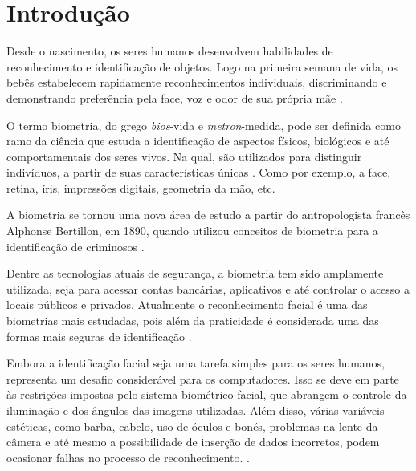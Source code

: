 
\chapter{Introdução}\label{cap:introducao}

Desde o nascimento, os seres humanos desenvolvem habilidades de reconhecimento 
e identificação de objetos. Logo na primeira semana de vida, os bebês estabelecem 
rapidamente reconhecimentos individuais, discriminando e demonstrando preferência 
pela face, voz e odor de sua própria mãe \cite{vieira2017}.

O termo biometria, do grego \textit{bios}-vida e \textit{metron}-medida, pode ser 
definida como ramo da ciência que estuda a identificação de aspectos físicos, biológicos e até 
comportamentais dos seres vivos. Na qual, são utilizados para distinguir indivíduos, 
a partir de suas características únicas \cite{ferreira2009}. Como por exemplo, a face, retina, 
íris, impressões digitais, geometria da mão, etc.

A biometria se tornou uma nova área de estudo a partir do antropologista francês
Alphonse Bertillon, em 1890, quando utilizou conceitos de biometria para a 
identificação de criminosos \cite{moraes2006}. 

Dentre as tecnologias atuais de segurança, a biometria tem sido amplamente 
utilizada, seja para acessar contas bancárias, aplicativos e até controlar 
o acesso a locais públicos e privados. Atualmente o reconhecimento facial 
é uma das biometrias mais estudadas, pois além da praticidade é considerada uma 
das formas mais seguras de identificação \cite{zhao2003}. 

Embora a identificação facial seja uma tarefa simples para os seres humanos, 
representa um desafio considerável para os computadores. Isso se deve em 
parte às restrições impostas pelo sistema biométrico facial, que abrangem 
o controle da iluminação e dos ângulos das imagens utilizadas. Além disso, 
várias variáveis estéticas, como barba, cabelo, uso de óculos e bonés, 
problemas na lente da câmera e até mesmo a possibilidade de inserção de 
dados incorretos, podem ocasionar falhas no processo de 
reconhecimento. \cite{cavalcanti2005}.

